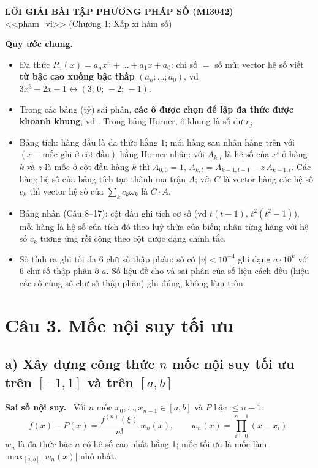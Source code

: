 \documentclass[11pt,a4paper]{article}
\newcommand{\ob}[1]{\fbox{$#1$}}
\newcommand{\pp}[1]{\par\smallskip\noindent\textbf{#1}\ }
\begin{document}
\begin{center}
{\Large\bfseries LỜI GIẢI BÀI TẬP PHƯƠNG PHÁP SỐ (MI3042)}\\[2pt]
{\large <<pham_vi>> \quad(Chương 1: Xấp xỉ hàm số)}
\end{center}

\noindent\textbf{Quy ước chung.}
\begin{itemize}
\item Đa thức $P_n(x)=a_nx^n+\dots+a_1x+a_0$: chỉ số $=$ số mũ; vector hệ số viết \textbf{từ bậc cao xuống bậc thấp} $(a_n;\dots;a_0)$, vd $3x^3-2x-1\leftrightarrow(3;\,0;\,-2;\,-1)$.
\item Trong các bảng (tỷ) sai phân, \textbf{các ô được chọn để lập đa thức được khoanh khung}, vd \ob{0.1234}. Trong bảng Horner, ô khung là số dư $r_j$.
\item Bảng tích: hàng đầu là đa thức hằng $1$; mỗi hàng sau nhân hàng trên với $(x-\text{mốc ghi ở cột đầu})$ bằng Horner nhân: với $A_{k,l}$ là hệ số của $x^l$ ở hàng $k$ và $z$ là mốc ở cột đầu hàng $k$ thì $A_{0,0}=1$, $A_{k,l}=A_{k-1,l-1}-z\,A_{k-1,l}$. Các hàng hệ số của bảng tích tạo thành ma trận $A$; với $C$ là vector hàng các hệ số $c_k$ thì vector hệ số của $\sum_kc_k\omega_k$ là $C\cdot A$.
\item Bảng nhân (Câu 8--17): cột đầu ghi tích cơ sở (vd $t(t-1)$, $t^2(t^2-1)$), mỗi hàng là hệ số của tích đó theo luỹ thừa của biến; nhân từng hàng với hệ số $c_k$ tương ứng rồi cộng theo cột được dạng chính tắc.
\item Số tính ra ghi tối đa 6 chữ số thập phân; số có $|v|<10^{-4}$ ghi dạng $a\cdot10^k$ với 6 chữ số thập phân ở $a$. Số liệu đề cho và sai phân của số liệu cách đều (hiệu các số cùng số chữ số thập phân) ghi đúng, không làm tròn.
\end{itemize}

\section{Câu 3. Mốc nội suy tối ưu}

\subsection{a) Xây dựng công thức $n$ mốc nội suy tối ưu trên $[-1,1]$ và trên $[a,b]$}

\pp{Sai số nội suy.} Với $n$ mốc $x_0,\dots,x_{n-1}\in[a,b]$ và $P$ bậc $\le n-1$:
\[ f(x)-P(x)=\frac{f^{(n)}(\xi)}{n!}\,w_n(x),\qquad w_n(x)=\prod_{i=0}^{n-1}(x-x_i). \]
$w_n$ là đa thức bậc $n$ có hệ số cao nhất bằng 1; mốc tối ưu là mốc làm $\max_{[a,b]}|w_n(x)|$ nhỏ nhất.
\end{document}
